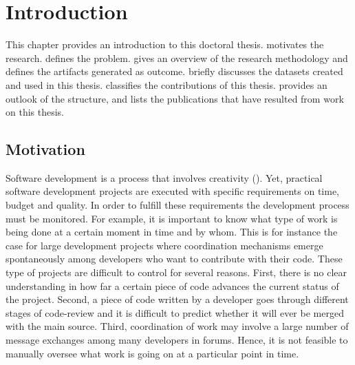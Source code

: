 \chapter{Introduction}
\label{chap:intro} %

This chapter provides an introduction to this doctoral thesis.  motivates the research.  defines the problem.  gives an overview of the research methodology and defines the artifacts generated as outcome.  briefly discusses the datasets created and used in this thesis.  classifies the contributions of this thesis.  provides an outlook of the structure, and  lists the publications that have resulted from work on this thesis. 

\section{Motivation}
\label{sec:intro-motivation}

Software development is a process that involves creativity (\citealp{DBLP:journals/jss/AldaveVGM19,DBLP:journals/jss/DingsoyrNBM12}). Yet, practical software development projects are executed with specific requirements on time, budget and quality. In order to fulfill these requirements the development process must be monitored. For example, it is important to know what type of work is being done at a certain moment in time and by whom. This is for instance the case for large development projects where coordination mechanisms emerge spontaneously among developers who want to contribute with their code.
These type of projects are difficult to control for several reasons. First, there is no clear understanding in how far a certain piece of code advances the current status of the project. Second, a piece of code written by a developer goes through different stages of code-review and it is difficult to predict whether it will ever be merged with the main source. Third, coordination of work may involve a large number of message exchanges among many developers in forums. Hence, it is not feasible to manually oversee what work is going on at a particular point in time. 

